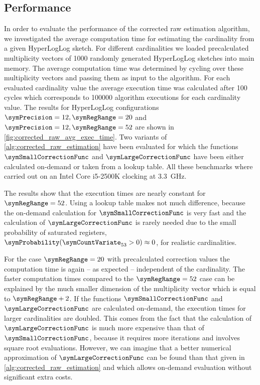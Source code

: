 \documentclass[a4paper]{scrartcl}
\begin{document}
\subsection{Performance}
\label{sec:corrected_raw_estimation_algorithm}
In order to evaluate the performance of the corrected raw estimation algorithm, we investigated the average computation time for estimating the cardinality from a given HyperLogLog sketch. For different cardinalities we loaded precalculated multiplicity vectors of \num{1000} randomly generated HyperLogLog sketches into main memory. The average computation time was determined by cycling over these multiplicity vectors and passing them as input to the algorithm. For each evaluated cardinality value the average execution time was calculated after 100 cycles which corresponds to \num{100000} algorithm executions for each cardinality value. The results for HyperLogLog configurations $\symPrecision=12, \symRegRange=20$ and $\symPrecision=12, \symRegRange=52$ are shown in \cref{fig:corrected_raw_avg_exec_time}. Two variants of \cref{alg:corrected_raw_estimation} have been evaluated for which the functions $\symSmallCorrectionFunc$ and $\symLargeCorrectionFunc$ have been either calculated on-demand or taken from a lookup table. All these benchmarks where carried out on an Intel Core i5-2500K clocking at \SI{3.3}{\giga\hertz}. 

The results show that the execution times are nearly constant for $\symRegRange=52$. Using a lookup table makes not much difference, because the on-demand calculation for  $\symSmallCorrectionFunc$ is very fast and the calculation of $\symLargeCorrectionFunc$ is rarely needed due to the small probability of saturated registers, $\symProbability(\symCountVariate_{53}>0)\approx 0$, for realistic cardinalities.

For the case $\symRegRange=20$ with precalculated correction values the computation time is again -- as expected -- independent of the cardinality. The faster computation times compared to the $\symRegRange=52$ case can be explained by the much smaller dimension of the multiplicity vector which is equal to $\symRegRange+2$. If the functions $\symSmallCorrectionFunc$ and $\symLargeCorrectionFunc$ are calculated on-demand, the execution times for larger cardinalities are doubled. This comes from the fact that the calculation of $\symLargeCorrectionFunc$ is much more expensive than that of $\symSmallCorrectionFunc$, because it requires more iterations and involves square root evaluations. However, we can imagine that a better numerical approximation of $\symLargeCorrectionFunc$ can be found than that given in \cref{alg:corrected_raw_estimation} and which allows on-demand evaluation without significant extra costs.
\end{document}

